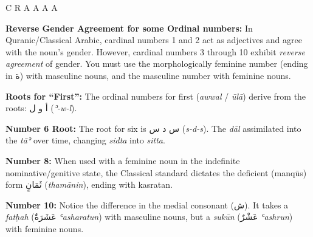 \documentclass[11pt, a4paper]{article}
\begin{document}
\begin{center}
\begin{threeparttable}
\begin{tabular}{ C R A A A A }
			\bottomrule
		\end{tabular}

		\begin{tablenotes}
			\small
			\item[(α)] \textbf{Reverse Gender Agreement for some Ordinal numbers:} In Quranic/Classical Arabic, cardinal numbers 1 and 2 act as adjectives and agree with the noun's gender.
			However, cardinal numbers 3 through 10 exhibit \textit{reverse agreement} of gender.
			You must use the morphologically feminine number (ending in \textarabic{ة}) with masculine nouns, and the masculine number with feminine nouns.
			\item[(β)] \textbf{Roots for ``First'':} The ordinal numbers for first (\textit{awwal} / \textit{ūlā}) derive from the roots: \textarabic{أ و ل} (\textit{ʾ-w-l}).
			\item[(γ)] \textbf{Number 6 Root:} The root for six is \textarabic{س د س} (\textit{s-d-s}).
			The \textit{dāl} assimilated into the \textit{tāʾ} over time, changing \textit{sidta} into \textit{sitta}.
			\item[(δ)] \textbf{Number 8:} When used with a feminine noun in the indefinite nominative/genitive state,
			the Classical standard dictates the deficient (manqūs) form \textarabic{ثَمَانٍ} (\textit{thamānin}), ending with kasratan.
			\item[(ε)] \textbf{Number 10:} Notice the difference in the medial consonant (\textarabic{ش}).
			It takes a \textit{fatḥah} (\textarabic{عَشَرَةٌ} \textit{ʿasharatun}) with masculine nouns,
			but a \textit{sukūn} (\textarabic{عَشْرٌ} \textit{ʿashrun}) with feminine nouns.
		\end{tablenotes}
	\end{threeparttable}
\end{center}

\end{document}
